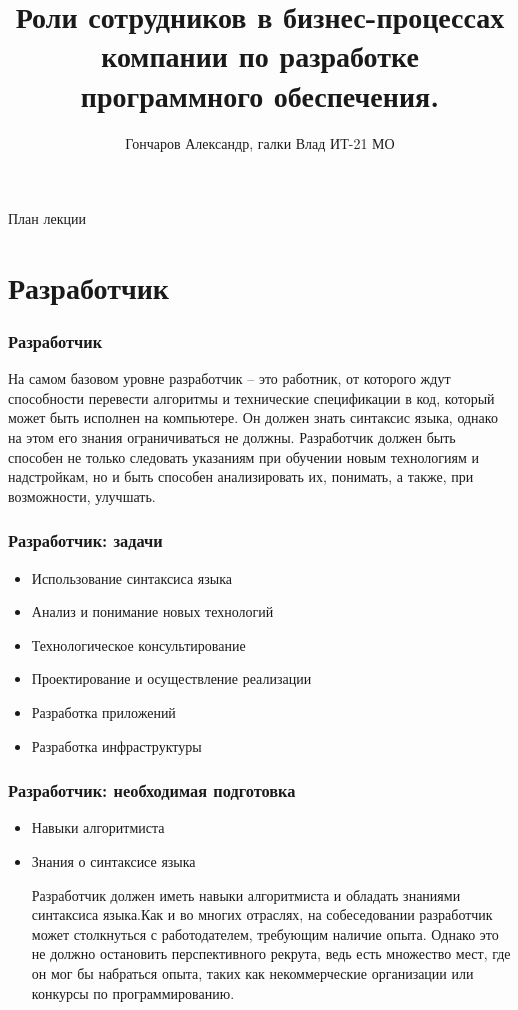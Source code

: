 \documentclass{../industrial-development}
\title{Роли сотрудников в бизнес-процессах компании по разработке программного обеспечения.}
\author{Гончаров Александр, галки Влад ИТ-21 МО}
\date{}
\begin{document}
\begin{frame}
  \titlepage
\end{frame}

\begin{frame}{План лекции}
  \tableofcontents
\end{frame}


\section{Разработчик }

\begin{frame} \frametitle{Разработчик}
	\begin{block}{}
		\alert {}На самом базовом уровне разработчик – это работник, от которого ждут способности перевести алгоритмы и технические спецификации в код, который может быть исполнен на компьютере. Он должен знать синтаксис языка, однако на этом его знания ограничиваться не должны. Разработчик должен быть способен не только следовать указаниям при обучении новым технологиям и надстройкам, но и быть способен анализировать их, понимать, а также, при возможности, улучшать.
		
	\end{block}
	
\end{frame}

\begin{frame} \frametitle{Разработчик: задачи}
	\begin{itemize}
		\item Использование синтаксиса языка
		\item Анализ и понимание новых технологий
		\item Технологическое консультирование
		\item Проектирование и осуществление реализации
		\item Разработка приложений
		\item Разработка инфраструктуры
	\end{itemize}
\end{frame}

\begin{frame} \frametitle{Разработчик: необходимая подготовка}
	\begin{itemize}
		\item Навыки алгоритмиста 
		\item Знания о синтаксисе языка
		\begin{block}{}
			\alert {Разработчик} должен иметь навыки алгоритмиста и обладать знаниями синтаксиса языка.Как и во многих отраслях, на собеседовании разработчик может столкнуться с работодателем, требующим наличие опыта. Однако это не должно остановить перспективного рекрута, ведь есть множество мест, где он мог бы набраться опыта, таких как некоммерческие организации или конкурсы по программированию. 
		\end{block}
	\end{itemize}
	
\end{frame}
\end{document}
